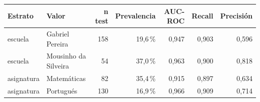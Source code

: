 \begin{tabular}{llrrrrr}
\toprule
Estrato & Valor & n test & Prevalencia & AUC-ROC & Recall & Precisión \\
\midrule
escuela & Gabriel Pereira & 158 & 19,6\,\% & 0,947 & 0,903 & 0,596 \\
escuela & Mousinho da Silveira & 54 & 37,0\,\% & 0,963 & 0,900 & 0,818 \\
asignatura & Matemáticas & 82 & 35,4\,\% & 0,915 & 0,897 & 0,634 \\
asignatura & Portugués & 130 & 16,9\,\% & 0,966 & 0,909 & 0,714 \\
\bottomrule
\end{tabular}
